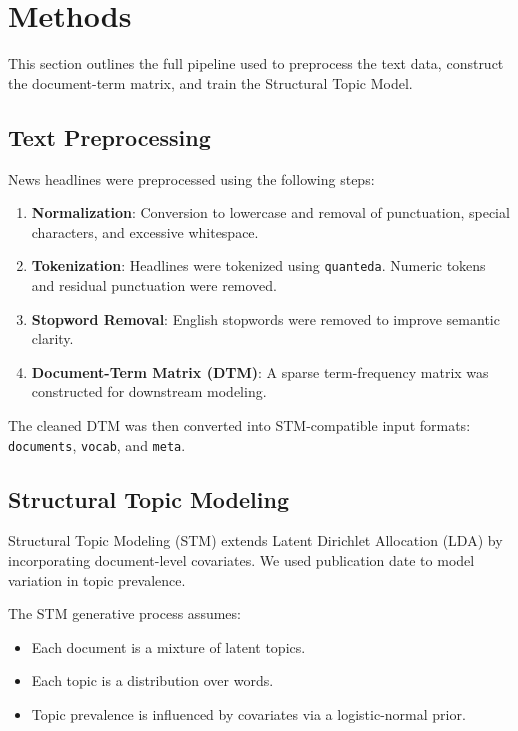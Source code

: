 \documentclass[11pt]{article}
\begin{document}
\section{Methods}

This section outlines the full pipeline used to preprocess the text data, construct the document-term matrix, and train the Structural Topic Model.

\subsection{Text Preprocessing}

News headlines were preprocessed using the following steps:

\begin{enumerate}
    \item \textbf{Normalization}: Conversion to lowercase and removal of punctuation, special characters, and excessive whitespace.
    \item \textbf{Tokenization}: Headlines were tokenized using \texttt{quanteda}. Numeric tokens and residual punctuation were removed.
    \item \textbf{Stopword Removal}: English stopwords were removed to improve semantic clarity.
    \item \textbf{Document-Term Matrix (DTM)}: A sparse term-frequency matrix was constructed for downstream modeling.
\end{enumerate}

The cleaned DTM was then converted into STM-compatible input formats: \texttt{documents}, \texttt{vocab}, and \texttt{meta}.

\subsection{Structural Topic Modeling}

Structural Topic Modeling (STM) extends Latent Dirichlet Allocation (LDA) by incorporating document-level covariates. We used publication date to model variation in topic prevalence.

The STM generative process assumes:
\begin{itemize}
    \item Each document is a mixture of latent topics.
    \item Each topic is a distribution over words.
    \item Topic prevalence is influenced by covariates via a logistic-normal prior.
\end{itemize}
\end{document}
